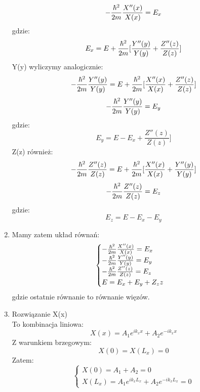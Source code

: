 \begin{enumerate}
\begin{equation} -\frac{\hbar^2}{2m}\frac{X''(x)}{X(x)}=E_x\end{equation}
gdzie:
\begin{equation}E_x=E+\frac{\hbar^2}{2m}[\frac{Y''(y)}{Y(y)}+\frac{Z''(z)}{Z(z)}]\end{equation}
Y(y) wyliczymy analogicznie:
\begin{equation}-\frac{\hbar^2}{2m}\frac{Y''(y)}{Y(y)}=E+\frac{\hbar^2}{2m}[\frac{X''(x)}{X(x)}+\frac{Z''(z)}{Z(z)}]\end{equation}
\begin{equation}-\frac{\hbar^2}{2m}\frac{Y''(y)}{Y(y)}=E_y\end{equation}
gdzie:
\begin{equation}E_y=E-E_x+\frac{Z''(z)}{Z(z)}]\end{equation}
Z(z) również:
\begin{equation}-\frac{\hbar^2}{2m}\frac{Z''(z)}{Z(z)}=E+\frac{\hbar^2}{2m}[\frac{X''(x)}{X(x)}+\frac{Y''(y)}{Y(y)}]\end{equation}
\begin{equation}-\frac{\hbar^2}{2m}\frac{Z''(z)}{Z(z)}=E_z\end{equation}
gdzie:
\begin{equation} E_z=E-E_x-E_y\end{equation}
\item Mamy zatem układ równań:\\
\begin{equation}
\begin{cases} 
-\frac{\hbar^2}{2m}\frac{X''(x)}{X(x)}=E_x\\
-\frac{\hbar^2}{2m}\frac{Y''(y)}{Y(y)}=E_y\\
-\frac{\hbar^2}{2m}\frac{Z''(z)}{Z(z)}=E_z\\
E=E_x+E_y+Z_zz\\
\end{cases}
\end{equation}
gdzie ostatnie równanie to równanie więzów.\\
\item Rozwiązanie X(x)\\
To kombinacja liniowa:
\begin{equation} X(x)=A_1 e^{ik_xx}+A_2 e^{-ik_xx}\end{equation}
Z warunkiem brzegowym:
\begin{equation} X(0)=X(L_x)=0\end{equation}
Zatem:
\begin{equation}
\begin{cases}
X(0)=A_1+A_2=0 \\
X(L_x)=A_1 e^{ik_xL_x}+A_2 e^{-ik_xL_x}=0
\end{cases} \label{War.brzeg}

\end{equation}
\end{enumerate}
